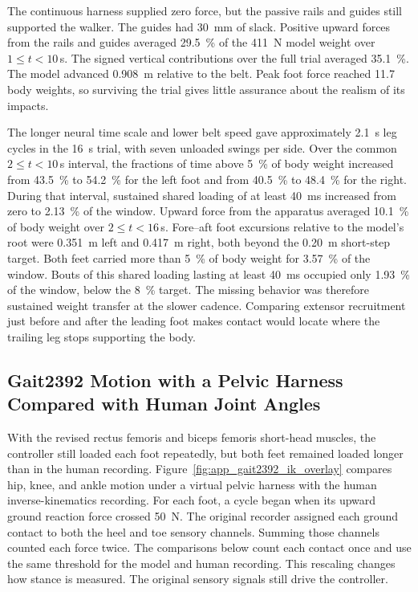 The continuous harness supplied zero force, but the passive rails and guides still supported the walker. The guides had \qty{30}{\milli\meter} of slack. Positive upward forces from the rails and guides averaged \qty{29.5}{\percent} of the \qty{411}{\newton} model weight over $1\leq t<10$\,s. The signed vertical contributions over the full trial averaged \qty{35.1}{\percent}. The model advanced \qty{0.908}{\meter} relative to the belt. Peak foot force reached 11.7 body weights, so surviving the trial gives little assurance about the realism of its impacts.

The longer neural time scale and lower belt speed gave approximately \qty{2.1}{\second} leg cycles in the \qty{16}{\second} trial, with seven unloaded swings per side. Over the common $2\leq t<10$\,s interval, the fractions of time above \qty{5}{\percent} of body weight increased from \qty{43.5}{\percent} to \qty{54.2}{\percent} for the left foot and from \qty{40.5}{\percent} to \qty{48.4}{\percent} for the right. During that interval, sustained shared loading of at least \qty{40}{\milli\second} increased from zero to \qty{2.13}{\percent} of the window. Upward force from the apparatus averaged \qty{10.1}{\percent} of body weight over $2\leq t<16$\,s. Fore--aft foot excursions relative to the model's root were \qty{0.351}{\meter} left and \qty{0.417}{\meter} right, both beyond the \qty{0.20}{\meter} short-step target. Both feet carried more than \qty{5}{\percent} of body weight for \qty{3.57}{\percent} of the window. Bouts of this shared loading lasting at least \qty{40}{\milli\second} occupied only \qty{1.93}{\percent} of the window, below the \qty{8}{\percent} target. The missing behavior was therefore sustained weight transfer at the slower cadence. Comparing extensor recruitment just before and after the leading foot makes contact would locate where the trailing leg stops supporting the body.

\subsection{Gait2392 Motion with a Pelvic Harness Compared with Human Joint Angles}\label{sec:app_ik_overlay}\label{sec:gait_library_results}\label{sec:walker_variant_results}

With the revised rectus femoris and biceps femoris short-head muscles, the controller still loaded each foot repeatedly, but both feet remained loaded longer than in the human recording. Figure~\ref{fig:app_gait2392_ik_overlay} compares hip, knee, and ankle motion under a virtual pelvic harness with the human inverse-kinematics recording. For each foot, a cycle began when its upward ground reaction force crossed \qty{50}{\newton}. The original recorder assigned each ground contact to both the heel and toe sensory channels. Summing those channels counted each force twice. The comparisons below count each contact once and use the same threshold for the model and human recording. This rescaling changes how stance is measured. The original sensory signals still drive the controller.

